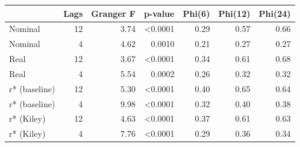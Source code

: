 \begin{tabular}{lrrrrrr}
\toprule
 & Lags & Granger F & p-value & Phi(6) & Phi(12) & Phi(24) \\
\midrule
Nominal & 12 & 3.74 & <0.0001 & 0.29 & 0.57 & 0.66 \\
Nominal & 4 & 4.62 & 0.0010 & 0.21 & 0.27 & 0.27 \\
Real & 12 & 3.67 & <0.0001 & 0.34 & 0.61 & 0.68 \\
Real & 4 & 5.54 & 0.0002 & 0.26 & 0.32 & 0.32 \\
r* (baseline) & 12 & 5.30 & <0.0001 & 0.40 & 0.65 & 0.64 \\
r* (baseline) & 4 & 9.98 & <0.0001 & 0.32 & 0.40 & 0.38 \\
r* (Kiley) & 12 & 4.63 & <0.0001 & 0.37 & 0.61 & 0.63 \\
r* (Kiley) & 4 & 7.76 & <0.0001 & 0.29 & 0.36 & 0.34 \\
\bottomrule
\end{tabular}
